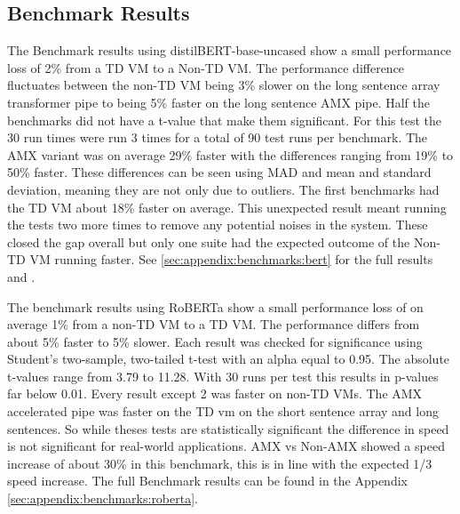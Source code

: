 
\subsection{Benchmark Results}
The Benchmark results using distilBERT-base-uncased show a small performance loss of 2\% from a TD VM to a Non-TD VM. The performance difference fluctuates between the non-TD VM being 3\% slower on the long sentence array transformer pipe to being 5\% faster on the long sentence AMX pipe. Half the benchmarks did not have a t-value that make them significant. For this test the 30 run times were run 3 times for a total of 90 test runs per benchmark. The AMX variant was on average 29\% faster with the differences ranging from 19\% to 50\% faster.
These differences can be seen using MAD and mean and standard deviation, meaning they are not only due to outliers. The first benchmarks had the TD VM about 18\% faster on average. This unexpected result meant running the tests two more times to remove any potential noises in the system. These closed the gap overall but only one suite had the expected outcome of the Non-TD VM running faster. See \ref{sec:appendix:benchmarks:bert} for the full results and .

The benchmark results using RoBERTa show a small performance loss of on average 1\% from a non-TD VM to a TD VM. The performance differs from about 5\% faster to 5\% slower. Each result was checked for significance using Student’s two-sample, two-tailed t-test with an alpha equal to 0.95. The absolute t-values range from 3.79 to 11.28. With 30 runs per test this results in p-values far below 0.01. Every result except 2 was faster on non-TD VMs. The AMX accelerated pipe was faster on the TD vm on the short sentence array and long sentences. So while theses tests are statistically significant the difference in speed is not significant for real-world applications. AMX vs Non-AMX showed a speed increase of about 30\% in this benchmark, this is in line with the expected 1/3 speed increase.
The full Benchmark results can be found in the Appendix \ref{sec:appendix:benchmarks:roberta}.

